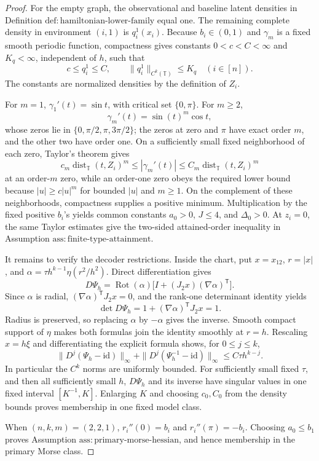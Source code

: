 \documentclass{article}
\begin{document}
\begin{proof}
For the empty graph, the observational and baseline latent densities in Definition \(\mathrm{def:hamiltonian\text{-}lower\text{-}family}\) equal one. The remaining complete density in environment \((i,1)\) is \(q_i^1(x_i)\). Because \(b_i\in(0,1)\) and \(\gamma_m\) is a fixed smooth periodic function, compactness gives constants \(0<c<C<\infty\) and \(K_q<\infty\), independent of \(h\), such that
\[
c\le q_i^1\le C,
\qquad
\|q_i^1\|_{C^k(\mathbb T)}\le K_q
\quad(i\in[n]).
\]
The constants are normalized densities by the definition of \(Z_i\).

For \(m=1\), \(\gamma_1'(t)=\sin t\), with critical set \(\{0,\pi\}\). For \(m\ge2\),
\[
\gamma_m'(t)=\sin(t)^m\cos t,
\]
whose zeros lie in \(\{0,\pi/2,\pi,3\pi/2\}\); the zeros at zero and \(\pi\) have exact order \(m\), and the other two have order one. On a sufficiently small fixed neighborhood of each zero, Taylor's theorem gives
\[
c_m\operatorname{dist}_{\mathbb T}(t,Z_i)^m
\le |\gamma_m'(t)|
\le C_m\operatorname{dist}_{\mathbb T}(t,Z_i)^m
\]
at an order-\(m\) zero, while an order-one zero obeys the required lower bound because \(|u|\ge c|u|^m\) for bounded \(|u|\) and \(m\ge1\). On the complement of these neighborhoods, compactness supplies a positive minimum. Multiplication by the fixed positive \(b_i\)'s yields common constants \(a_0>0\), \(J\le4\), and \(\Delta_0>0\). At \(z_i=0\), the same Taylor estimates give the two-sided attained-order inequality in Assumption \(\mathrm{ass:finite\text{-}type\text{-}attainment}\).

It remains to verify the decoder restrictions. Inside the chart, put \(x=x_{12}\), \(r=|x|\), and \(\alpha=\tau h^{k-1}\eta(r^2/h^2)\). Direct differentiation gives
\[
D\Psi_h=\operatorname{Rot}(\alpha)
\bigl[I+(J_2x)(\nabla\alpha)^{\mathsf T}\bigr].
\]
Since \(\alpha\) is radial, \((\nabla\alpha)^{\mathsf T}J_2x=0\), and the rank-one determinant identity yields
\[
\det D\Psi_h=1+(\nabla\alpha)^{\mathsf T}J_2x=1.
\]
Radius is preserved, so replacing \(\alpha\) by \(-\alpha\) gives the inverse. Smooth compact support of \(\eta\) makes both formulas join the identity smoothly at \(r=h\). Rescaling \(x=h\xi\) and differentiating the explicit formula shows, for \(0\le j\le k\),
\[
\|D^j(\Psi_h-\mathrm{id})\|_\infty
+\|D^j(\Psi_h^{-1}-\mathrm{id})\|_\infty
\le C\tau h^{k-j}.
\]
In particular the \(C^k\) norms are uniformly bounded. For sufficiently small fixed \(\tau\), and then all sufficiently small \(h\), \(D\Psi_h\) and its inverse have singular values in one fixed interval \([K^{-1},K]\). Enlarging \(K\) and choosing \(c_0,C_0\) from the density bounds proves membership in one fixed model class.

When \((n,k,m)=(2,2,1)\), \(r_i''(0)=b_i\) and \(r_i''(\pi)=-b_i\). Choosing \(a_0\le b_1\) proves Assumption \(\mathrm{ass:primary\text{-}morse\text{-}hessian}\), and hence membership in the primary Morse class.
\end{proof}
\end{document}
